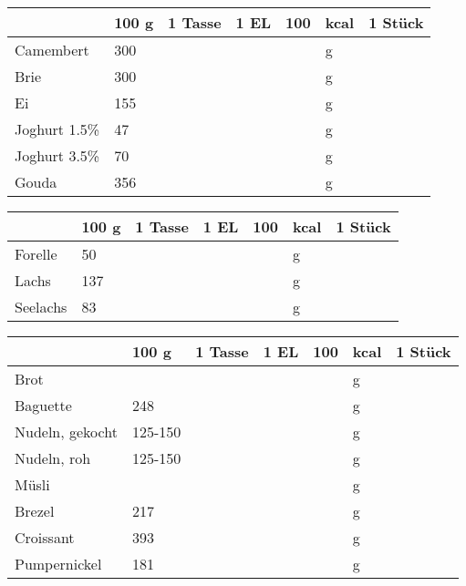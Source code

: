 \begin{tabularx}{\linewidth}{X|l|r|r|rl|r}
                  &   100 g & 1 Tasse & 1 EL &      100 & kcal    & 1 Stück  \\
\hline
Camembert         &     300 &         &      &          & g       &          \\
Brie              &     300 &         &      &          & g       &          \\
Ei                &     155 &         &      &          & g       &          \\
Joghurt 1.5\%     &      47 &         &      &          & g       &          \\
Joghurt 3.5\%     &      70 &         &      &          & g       &          \\
Gouda             &     356 &         &      &          & g       &          \\
\end{tabularx}
\begin{tabularx}{\linewidth}{X|l|r|r|rl|r}
                  &   100 g & 1 Tasse & 1 EL &      100 & kcal    & 1 Stück  \\
\hline
Forelle           &      50 &         &      &          & g       &          \\
Lachs             &     137 &         &      &          & g       &          \\
Seelachs          &      83 &         &      &          & g       &          \\
\end{tabularx}
\begin{tabularx}{\linewidth}{X|l|r|r|rl|r}
                  &   100 g & 1 Tasse & 1 EL &      100 & kcal    & 1 Stück  \\
\hline
Brot              &         &         &      &          & g       &          \\
Baguette          &     248 &         &      &          & g       &          \\
Nudeln, gekocht   & 125-150 &         &      &          & g       &          \\
Nudeln, roh       & 125-150 &         &      &          & g       &          \\
Müsli             &         &         &      &          & g       &          \\
Brezel            &     217 &         &      &          & g       &          \\
Croissant         &     393 &         &      &          & g       &          \\
Pumpernickel      &     181 &         &      &          & g       &          \\
\end{tabularx}
